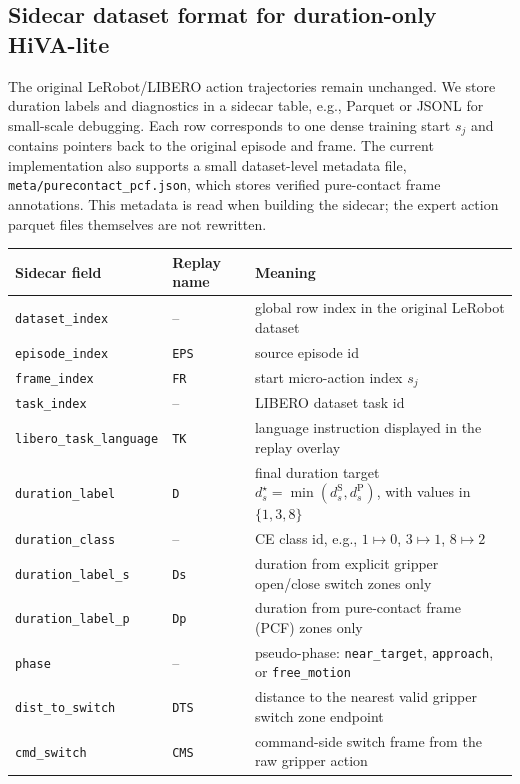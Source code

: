 \documentclass[10pt,twocolumn,letterpaper]{article}
\begin{document}
\subsection{Sidecar dataset format for duration-only HiVA-lite}
\label{app:dataset-format}
The original LeRobot/LIBERO action trajectories remain unchanged. We store duration labels and diagnostics in a sidecar table, e.g., Parquet or JSONL for small-scale debugging. Each row corresponds to one dense training start $s_j$ and contains pointers back to the original episode and frame. The current implementation also supports a small dataset-level metadata file, \texttt{meta/purecontact\_pcf.json}, which stores verified pure-contact frame annotations. This metadata is read when building the sidecar; the expert action parquet files themselves are not rewritten.
\begin{table}[t]
\centering
\scriptsize
\begin{tabular}{@{}p{}p{}p{}@{}}
\toprule
Sidecar field & Replay name & Meaning \\
\midrule
\texttt{dataset\_index} & -- & global row index in the original LeRobot dataset \\
\texttt{episode\_index} & \texttt{EPS} & source episode id \\
\texttt{frame\_index} & \texttt{FR} & start micro-action index $s_j$ \\
\texttt{task\_index} & -- & LIBERO dataset task id \\
\texttt{libero\_task\_language} & \texttt{TK} & language instruction displayed in the replay overlay \\
\texttt{duration\_label} & \texttt{D} & final duration target $d_s^\star=\min(d_s^{\mathrm{S}},d_s^{\mathrm{P}})$, with values in $\{1,3,8\}$ \\
\texttt{duration\_class} & -- & CE class id, e.g., $1\mapsto0$, $3\mapsto1$, $8\mapsto2$ \\
\texttt{duration\_label\_s} & \texttt{Ds} & duration from explicit gripper open/close switch zones only \\
\texttt{duration\_label\_p} & \texttt{Dp} & duration from pure-contact frame (PCF) zones only \\
\texttt{phase} & -- & pseudo-phase: \texttt{near\_target}, \texttt{approach}, or \texttt{free\_motion} \\
\texttt{dist\_to\_switch} & \texttt{DTS} & distance to the nearest valid gripper switch zone endpoint \\
\texttt{cmd\_switch} & \texttt{CMS} & command-side switch frame from the raw gripper action \\

\end{tabular}
\end{table}
\end{document}
